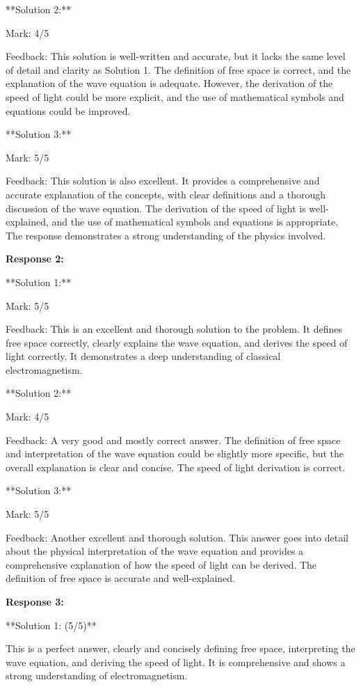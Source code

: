 \documentclass[a4paper,11pt]{article}
\begin{document}
**Solution 2:**

Mark: 4/5

Feedback: This solution is well-written and accurate, but it lacks the same level of detail and clarity as Solution 1. The definition of free space is correct, and the explanation of the wave equation is adequate. However, the derivation of the speed of light could be more explicit, and the use of mathematical symbols and equations could be improved.

**Solution 3:**

Mark: 5/5

Feedback: This solution is also excellent. It provides a comprehensive and accurate explanation of the concepts, with clear definitions and a thorough discussion of the wave equation. The derivation of the speed of light is well-explained, and the use of mathematical symbols and equations is appropriate. The response demonstrates a strong understanding of the physics involved.

\bigskip    
\textbf{Response 2:}

**Solution 1:**

Mark: 5/5

Feedback: This is an excellent and thorough solution to the problem. It defines free space correctly, clearly explains the wave equation, and derives the speed of light correctly. It demonstrates a deep understanding of classical electromagnetism. 

**Solution 2:**

Mark: 4/5 

Feedback: A very good and mostly correct answer. The definition of free space and interpretation of the wave equation could be slightly more specific, but the overall explanation is clear and concise. The speed of light derivation is correct.

**Solution 3:** 

Mark: 5/5

Feedback: Another excellent and thorough solution. This answer goes into detail about the physical interpretation of the wave equation and provides a comprehensive explanation of how the speed of light can be derived. The definition of free space is accurate and well-explained.

\bigskip    
\textbf{Response 3:}

**Solution 1: (5/5)**

This is a perfect answer, clearly and concisely defining free space, interpreting the wave equation, and deriving the speed of light. It is comprehensive and shows a strong understanding of electromagnetism.
\end{document}
